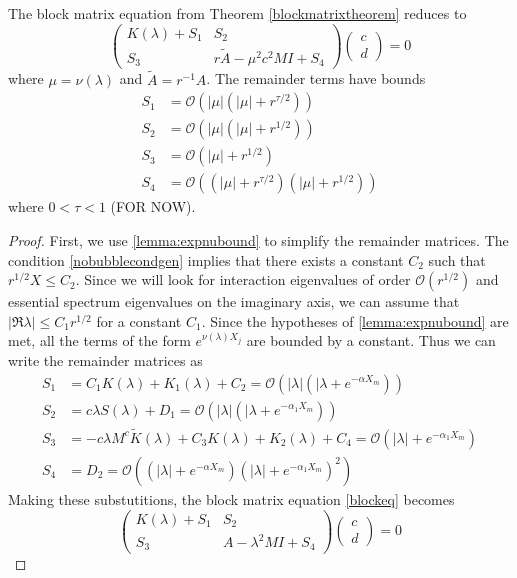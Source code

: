 \documentclass[thesis.tex]{subfiles}
\begin{document}
\begin{lemma}\label{reparam}
The block matrix equation from Theorem \ref{blockmatrixtheorem} reduces to
\begin{equation}\label{blockeq2}
\begin{pmatrix}
K(\lambda) + S_1 & S_2 \\
S_3 & r \tilde{A} - \mu^2 c^2 M I + S_4
\end{pmatrix}
\begin{pmatrix} c \\ d \end{pmatrix} = 0
\end{equation}
where $\mu = \nu(\lambda)$ and $\tilde{A} = r^{-1} A$. The remainder terms have bounds
\begin{align*}
S_1 &= \mathcal{O}(|\mu|(|\mu| + r^{\tau/2})) \\
S_2 &= \mathcal{O}(|\mu|(|\mu| + r^{1/2})) \\
S_3 &= \mathcal{O}(|\mu| + r^{1/2}) \\
S_4 &= \mathcal{O}((|\mu| + r^{\tau/2})(|\mu| + r^{1/2})) 
\end{align*}
where $0 < \tau < 1$ (FOR NOW).
\begin{proof}
First, we use \cref{lemma:expnubound} to simplify the remainder matrices. The condition \cref{nobubblecondgen} implies that there exists a constant $C_2$ such that $r^{1/2} X \leq C_2$. Since we will look for interaction eigenvalues of order $\mathcal{O}(r^{1/2})$ and essential spectrum eigenvalues on the imaginary axis, we can assume that $|\Re \lambda| \leq C_1 r^{1/2}$ for a constant $C_1$. Since the hypotheses of \cref{lemma:expnubound} are met, all the terms of the form $e^{\nu(\lambda)X_j}$ are bounded by a constant. Thus we can write the remainder matrices as
\begin{align*}
S_1 &= C_1 K(\lambda) + K_1(\lambda) + C_2 = \mathcal{O}(|\lambda|(|\lambda + e^{-\alpha X_m})) \\
S_2 &= c \lambda S(\lambda) + D_1 = \mathcal{O}(|\lambda|(|\lambda + e^{-\alpha_1 X_m})) \\
S_3 &= -c \lambda M^c \tilde{K}(\lambda) + C_3 K(\lambda) + K_2(\lambda) + C_4 = \mathcal{O}(|\lambda| + e^{-\alpha_1 X_m}) \\
S_4 &= D_2 = \mathcal{O}((|\lambda| + e^{-\alpha X_m})(|\lambda| + e^{-\alpha_1 X_m})^2)
\end{align*}
Making these substutitions, the block matrix equation \cref{blockeq} becomes
\begin{equation}\label{blockeqred}
\begin{pmatrix}
K(\lambda) + S_1 & S_2 \\
S_3 & A - \lambda^2 MI + S_4
\end{pmatrix}
\begin{pmatrix} c \\ d \end{pmatrix} = 0
\end{equation}


\end{proof}
\end{lemma}
\end{document}
